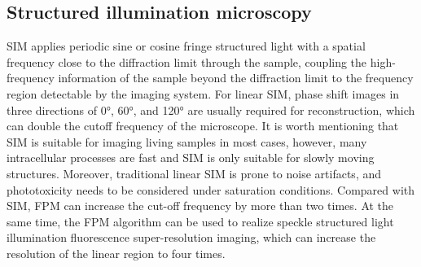 \documentclass[journal,review,submit,pdftex,moreauthors]{Definitions/mdpi}
\begin{document}
\subsection{Structured illumination microscopy}
SIM applies periodic sine or cosine fringe structured light with a spatial frequency close to the diffraction limit through the sample, coupling the high-frequency information of the sample beyond the diffraction limit to the frequency region detectable by the imaging system\cite{chen2023superresolution}. For linear SIM, phase shift images in three directions of 0°, 60°, and 120° are usually required for reconstruction, which can double the cutoff frequency of the microscope. It is worth mentioning that SIM is suitable for imaging living samples in most cases, however, many intracellular processes are fast and SIM is only suitable for slowly moving structures. Moreover, traditional linear SIM is prone to noise artifacts, and phototoxicity needs to be considered under saturation conditions. Compared with SIM, FPM can increase the cut-off frequency by more than two times. At the same time, the FPM algorithm can be used to realize speckle structured light illumination fluorescence super-resolution imaging, which can increase the resolution of the linear region to four times\cite{chen2023superresolution,gustafsson2005nonlinear}.


\end{document}
